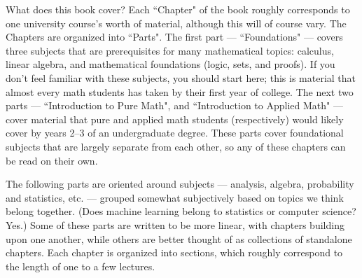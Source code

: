 \documentclass[../../../main.tex]{subfiles}
\begin{document}
What does this book cover?
Each ``Chapter" of the book roughly corresponds to one university course's worth of material, although this will of course vary. The Chapters are organized into ``Parts".
The first part --- ``Foundations" --- covers three subjects that are prerequisites for many mathematical topics: calculus, linear algebra, and mathematical foundations (logic, sets, and proofs). If you don't feel familiar with these subjects, you should start here; this is material that almost every math students has taken by their first year of college. The next two parts --- ``Introduction to Pure Math", and ``Introduction to Applied Math" --- cover material that pure and applied math students (respectively) would likely cover by years 2--3 of an undergraduate degree. These parts cover foundational subjects that are largely separate from each other, so any of these chapters can be read on their own. 

The following parts are oriented around subjects --- analysis, algebra, probability and statistics, etc. --- grouped somewhat subjectively based on topics we think belong together. (Does machine learning belong to statistics or computer science? Yes.) Some of these parts are written to be more linear, with chapters building upon one another, while others are better thought of as collections of standalone chapters. Each chapter is organized into sections, which roughly correspond to the length of one to a few lectures.
\end{document}
